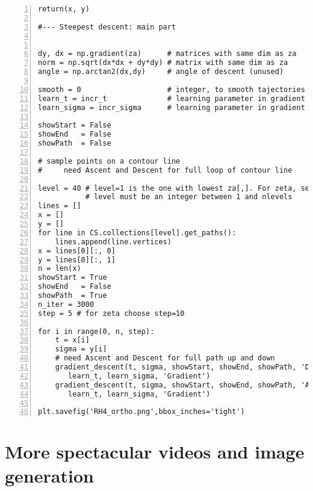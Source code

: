 \documentclass[oneside,10pt]{book}
\begin{document}
\begin{lstlisting}[numbers=left]
    return(x, y)  

#--- Steepest descent: main part 


dy, dx = np.gradient(za)      # matrices with same dim as za 
norm = np.sqrt(dx*dx + dy*dy) # matrix with same dim as za
angle = np.arctan2(dx,dy)     # angle of descent (unused)

smooth = 0                    # integer, to smooth tajectories (0 = no smoothing)
learn_t = incr_t              # learning parameter in gradient method  
learn_sigma = incr_sigma      # learning parameter in gradient method 

showStart = False
showEnd   = False
showPath  = False

# sample points on a contour line
#     need Ascent and Descent for full loop of contour line

level = 40 # level=1 is the one with lowest za[,]. For zeta, set level=36 
           # level must be an integer between 1 and nlevels
lines = []  
x = []
y = []
for line in CS.collections[level].get_paths():
    lines.append(line.vertices)
x = lines[0][:, 0]
y = lines[0][:, 1]
n = len(x)
showStart = True
showEnd   = False
showPath  = True
n_iter = 3000 
step = 5 # for zeta choose step=10

for i in range(0, n, step):  
    t = x[i]
    sigma = y[i]
    # need Ascent and Descent for full path up and down
    gradient_descent(t, sigma, showStart, showEnd, showPath, 'Descent', n_iter, \
       learn_t, learn_sigma, 'Gradient')
    gradient_descent(t, sigma, showStart, showEnd, showPath, 'Ascent', n_iter, \
       learn_t, learn_sigma, 'Gradient')

plt.savefig('RH4_ortho.png',bbox_inches='tight')
\end{lstlisting}











\section{More spectacular videos and image generation}\label{misc911}
\end{document}
